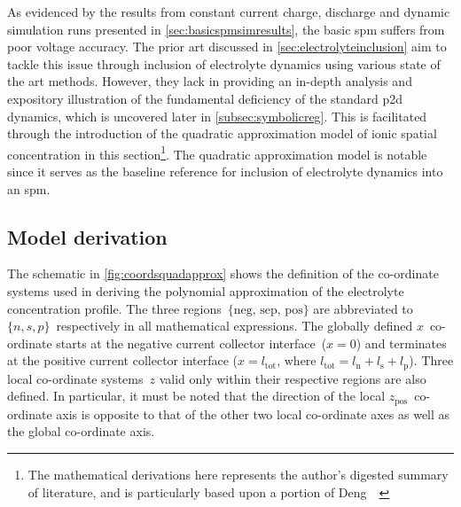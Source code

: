 
As  evidenced by  the  results from  constant  current  charge, discharge  and
dynamic  simulation runs presented in \cref{sec:basicspmsimresults},  the basic 
\gls{spm} suffers  from poor voltage accuracy. The prior art discussed in
\cref{sec:electrolyteinclusion} aim to tackle this issue through inclusion of
electrolyte dynamics using various state of the art methods. However, they lack
in providing an in-depth analysis and expository illustration of the fundamental
deficiency of the standard \gls{p2d} dynamics, which is uncovered later in
\cref{subsec:symbolicreg}. This is facilitated through the introduction of the
quadratic approximation model of ionic spatial concentration in this
section\footnote{The  mathematical derivations  here  represents  the  author's 
    digested  summary  of  literature, and  is  particularly  based  upon  a 
portion  of  Deng~\etal~\cite{Deng2018}}. The quadratic approximation model is
notable since it serves as the baseline reference for inclusion of electrolyte
dynamics into an \gls{spm}.



\subsection{Model derivation}\label{subsec:quadraticmodelderiv}

The  schematic  in  \cref{fig:coordsquadapprox}  shows  the  definition  of  the
co-ordinate  systems  used  in  deriving the  polynomial  approximation  of  the
electrolyte  concentration   profile.  The  three   regions~${\{\text{neg,  sep,
pos}\}}$  are  abbreviated  to ${\{n,s,p\}}$~respectively  in  all  mathematical
expressions. The globally defined $x$~co-ordinate starts at the negative current
collector interface~(${x=0}$)  and terminates at the  positive current collector
interface  ($x  = l_\text{tot},\,  \text{where  }  l_\text{tot} =  l_\text{n}  +
l_\text{s} + l_\text{p}$). Three local co-ordinate systems~$z$ valid only within
their respective regions are also defined.  In particular, it must be noted that
the direction of  the local $z_\text{pos}$~co-ordinate axis is  opposite to that
of the other two local co-ordinate axes as well as the global co-ordinate axis.

